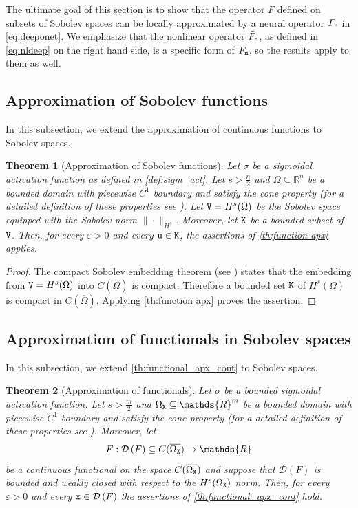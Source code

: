 \documentclass[10pt]{article}
\numberwithin{equation}{section}
\newtheorem{theorem}[theorem]{Theorem}
\theoremstyle{nonumberplain}
\newtheorem{proof}{Proof}
\newcommand{\R}{\mathds{R}}
\newcommand{\dom}[1]{\mathcal{D}\left(#1\right)}
\newcommand{\norms}[1]{\|#1\|}
\newcommand{\ve}{\varepsilon}
\newcommand{\X}{{\tt X}}
\newcommand{\V}{{\tt V}}
\newcommand{\n}{{\tt n}}
\newcommand{\x}{{\tt x}}
\begin{document}
The ultimate goal of this section is to show that the operator $F$ defined on subsets of Sobolev spaces can be locally approximated by a neural operator $F_\n$ in \autoref{eq:deeponet}. We emphasize that the nonlinear operator $\tilde{F}_\n$, as defined in \autoref{eq:nldeep} on the right hand side, is a specific form of $F_\n$, so the results apply to them as well.
\subsection{Approximation of Sobolev functions}

In this subsection, we extend the approximation of continuous functions to Sobolev spaces.
\begin{theorem}[Approximation of Sobolev functions] \label{th:function_apx_sob} 
	Let $\sigma$ be a sigmoidal activation function as defined in \autoref{def:sigm_act}. Let $s>\frac{n}{2}$ and $\Omega \subseteq \R^n$ be a bounded domain with piecewise $C^1$ boundary and satisfy the cone property (for a detailed definition of these properties see \cite{Ada75}). Let $\V=H^s(\Omega)$ be the  Sobolev space equipped with the Sobolev norm $\norms{\cdot}_{H^s}$. Moreover, let ${\tt K}$ be a bounded subset of $\V$. Then, for every $\ve >0$ and every ${\tt u} \in {\tt K}$, the assertions of \autoref{th:function apx} applies.
\end{theorem}
\begin{proof}
	The compact Sobolev embedding theorem (see \cite[Thm. 6.2]{Ada75}) states that the embedding from ${\tt V}=H^s(\Omega)$ into $C(\overline{\Omega})$ is compact. Therefore a bounded set ${\tt K}$ of $H^s(\Omega)$  is compact in $C(\overline{\Omega})$. Applying \autoref{th:function apx} proves the assertion.
\end{proof}


\subsection{Approximation of functionals in Sobolev spaces} 

In this subsection, we extend \autoref{th:functional_apx_cont} to Sobolev spaces.
\begin{theorem}[Approximation of functionals]\label{th:functional apx}
	Let $\sigma$ be a bounded sigmoidal activation function. Let $s>\frac{m}{2}$ and $\Omega_\X \subseteq \R^m$ be a bounded domain with piecewise $C^1$ boundary and satisfy the cone property (for a detailed definition of these properties see \cite{Ada75}). Moreover, let 
	\begin{equation*}
		F: \dom{F} \subseteq C(\overline{\Omega_\X}) \to \R
	\end{equation*}
	be a continuous functional on the space $C(\overline{\Omega_\X})$ and suppose that $\dom{F}$ is bounded and weakly closed with respect to the $H^s(\Omega_\X)$ norm. Then, for every $\ve >0$ and every $\x \in \dom{F}$ the assertions of \autoref{th:functional_apx_cont} hold.
\end{theorem}
\end{document}
